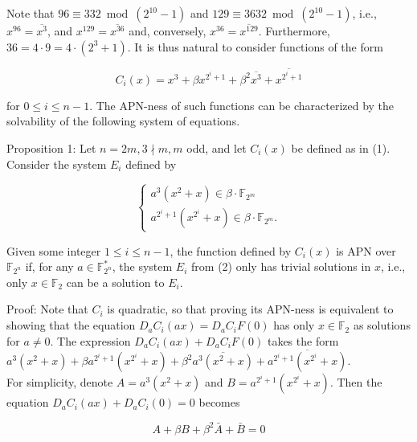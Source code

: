 \documentclass[10pt]{article}
\begin{document}
Note that $96 \equiv 332 \bmod \left(2^{10}-1\right)$ and $129 \equiv 3632 \bmod \left(2^{10}-1\right)$, i.e., $x^{96}=\overline{x^{3}}$, and $x^{129}=\overline{x^{36}}$ and, conversely, $x^{36}=\overline{x^{129}}$. Furthermore, $36=4 \cdot 9=4 \cdot\left(2^{3}+1\right)$. It is thus natural to consider functions of the form


\begin{equation*}
C_{i}(x)=x^{3}+\beta x^{2^{i}+1}+\beta^{2} \overline{x^{3}}+\overline{x^{2^{i}+1}} \tag{1}
\end{equation*}


for $0 \leq i \leq n-1$. The APN-ness of such functions can be characterized by the solvability of the following system of equations.

Proposition 1: Let $n=2 m, 3 \nmid m, m$ odd, and let $C_{i}(x)$ be defined as in (1). Consider the system $E_{i}$ defined by

\[
\left\{\begin{array}{l}
a^{3}\left(x^{2}+x\right) \in \beta \cdot \mathbb{F}_{2^{m}}  \tag{2}\\
a^{2^{i}+1}\left(x^{2^{i}}+x\right) \in \beta \cdot \mathbb{F}_{2^{m}} .
\end{array}\right.
\]

Given some integer $1 \leq i \leq n-1$, the function defined by $C_{i}(x)$ is APN over $\mathbb{F}_{2^{n}}$ if, for any $a \in \mathbb{F}_{2^{n}}^{*}$, the system $E_{i}$ from (2) only has trivial solutions in $x$, i.e., only $x \in \mathbb{F}_{2}$ can be a solution to $E_{i}$.

Proof: Note that $C_{i}$ is quadratic, so that proving its APN-ness is equivalent to showing that the equation $D_{a} C_{i}(a x)=D_{a} C_{i} F(0)$ has only $x \in \mathbb{F}_{2}$ as solutions for $a \neq 0$. The expression $D_{a} C_{i}(a x)+D_{a} C_{i} F(0)$ takes the form\\
$a^{3}\left(x^{2}+x\right)+\beta a^{2^{i}+1}\left(x^{2^{i}}+x\right)+\beta^{2} \overline{a^{3}\left(x^{2}+x\right)}+\overline{a^{2^{i}+1}\left(x^{2^{i}}+x\right)}$.\\
For simplicity, denote $A=a^{3}\left(x^{2}+x\right)$ and $B=a^{2^{i}+1}\left(x^{2^{i}}+x\right)$. Then the equation $D_{a} C_{i}(a x)+ D_{a} C_{i}(0)=0$ becomes


\begin{equation*}
A+\beta B+\beta^{2} \bar{A}+\bar{B}=0 \tag{3}
\end{equation*}
\end{document}
